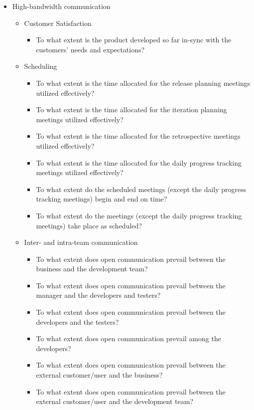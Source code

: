 \begin{appendices}
\begin{itemize}
	\item High-bandwidth communication
		\begin{itemize}
			\item Customer Satisfaction
				\begin{itemize}
					\item To what extent is the product developed so far in-sync with the customers' needs and expectations?
				\end{itemize}
			\item Scheduling
				\begin{itemize}
					\item To what extent is the time allocated for the release planning meetings utilized effectively? 
					\item To what extent is the time allocated for the iteration planning meetings utilized effectively?
					\item To what extent is the time allocated for the retrospective meetings utilized effectively? 
					\item To what extent is the time allocated for the daily progress tracking meetings utilized effectively? 
					\item To what extent do the scheduled meetings (except the daily progress tracking meetings) begin and end on time? 
					\item To what extent do the meetings (except the daily progress tracking meetings) take place as scheduled? 
				\end{itemize}
			\item Inter- and intra-team communication
				\begin{itemize}
					\item To what extent does open communication prevail between the business and the development team? 
					\item To what extent does open communication prevail between the manager and the developers and testers? 
					\item To what extent does open communication prevail between the developers and the testers? 
					\item To what extent does open communication prevail among the developers? 
					\item To what extent does open communication prevail between the external customer/user and the business? 
					\item To what extent does open communication prevail between the external customer/user and the development team? 

\end{itemize}
\end{itemize}
\end{itemize}
\end{appendices}
